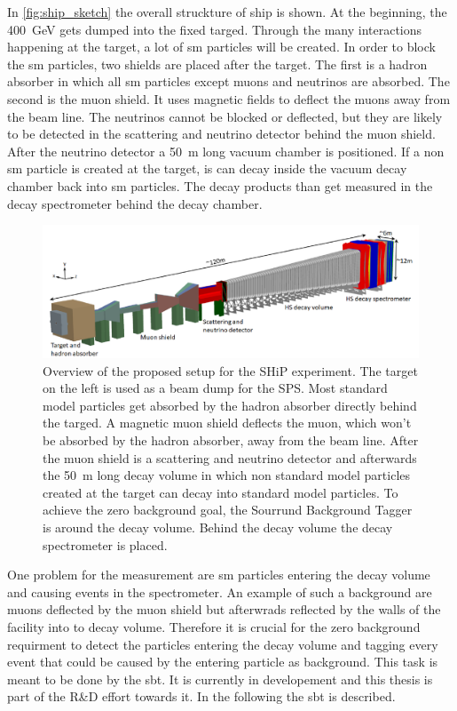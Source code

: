 In \autoref{fig:ship_sketch} the overall struckture of \ac{ship} is shown.
At the beginning, the \SI{400}{\giga\electronvolt} gets dumped into the fixed targed.
Through the many interactions happening at the target, a lot of \ac{sm} particles will be created.
In order to block the \ac{sm} particles, two shields are placed after the target.
The first is a hadron absorber in which all \ac{sm} particles except muons and neutrinos are absorbed.
The second is the muon shield. 
It uses magnetic fields to deflect the muons away from the beam line.
The neutrinos cannot be blocked or deflected, but they are likely to be detected in the scattering and neutrino detector behind the muon shield.
After the neutrino detector a \SI{50}{\meter} long vacuum chamber is positioned.
If a non \ac{sm} particle is created at the target, is can decay inside the vacuum decay chamber back into \ac{sm} particles.
The decay products than get measured in the decay spectrometer behind the decay chamber.
\begin{figure}
	\centering
	\includegraphics[width=1.\textwidth]{pictures/ship_sketch}
	\caption[Overview of the SHiP experiment.]{Overview of the proposed setup for the SHiP experiment. The target on the left is used as a beam dump for the SPS. Most standard model particles get absorbed by the hadron absorber directly behind the targed. A magnetic muon shield deflects the muon, which won't be absorbed by the hadron absorber, away from the beam line. After the muon shield is a scattering and neutrino detector and afterwards the \SI{50}{\meter} long decay volume in which non standard model particles created at the target can decay into standard model particles. To achieve the zero background goal, the Sourrund Background Tagger is around the decay volume. Behind the decay volume the decay spectrometer is placed. \cite{ship_coll}}
	\label{fig:ship_sketch}
\end{figure}

One problem for the measurement are \ac{sm} particles entering the decay volume and causing events in the spectrometer.
An example of such a background are muons deflected by the muon shield but afterwrads reflected by the walls of the facility into to decay volume.
Therefore it is crucial for the zero background requirment to detect the particles entering the decay volume and tagging every event that could be caused by the entering particle as background.
This task is meant to be done by the \ac{sbt}.
It is currently in developement and this thesis is part of the R\&D effort towards it.
In the following the \ac{sbt} is described.

